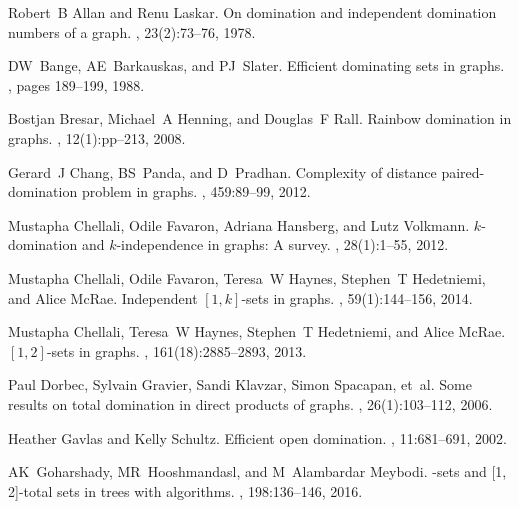\documentclass[A4,12pt]{article}
\theoremstyle{definition}
\theoremstyle{remark}
\begin{document}
\begin{thebibliography}{10}
	
	Robert~B Allan and Renu Laskar.
	\newblock On domination and independent domination numbers of a graph.
	, 23(2):73--76, 1978.
	
	DW~Bange, AE~Barkauskas, and PJ~Slater.
	\newblock Efficient dominating sets in graphs.
	, pages 189--199, 1988.
	
	Bostjan Bresar, Michael~A Henning, and Douglas~F Rall.
	\newblock Rainbow domination in graphs.
	, 12(1):pp--213, 2008.
	
	Gerard~J Chang, BS~Panda, and D~Pradhan.
	\newblock Complexity of distance paired-domination problem in graphs.
	, 459:89--99, 2012.
	
	Mustapha Chellali, Odile Favaron, Adriana Hansberg, and Lutz Volkmann.
	\newblock $k$-domination and $k$-independence in graphs: A survey.
	, 28(1):1--55, 2012.
	
	Mustapha Chellali, Odile Favaron, Teresa~W Haynes, Stephen~T Hedetniemi, and
	Alice McRae.
	\newblock Independent $[1, k]$-sets in graphs.
	, 59(1):144--156, 2014.
	
	Mustapha Chellali, Teresa~W Haynes, Stephen~T Hedetniemi, and Alice McRae.
	\newblock $[1, 2]$-sets in graphs.
	, 161(18):2885--2893, 2013.
	
	Paul Dorbec, Sylvain Gravier, Sandi Klavzar, Simon Spacapan, et~al.
	\newblock Some results on total domination in direct products of graphs.
	, 26(1):103--112, 2006.
	
	Heather Gavlas and Kelly Schultz.
	\newblock Efficient open domination.
	, 11:681--691, 2002.
	
	AK~Goharshady, MR~Hooshmandasl, and M~Alambardar Meybodi.
	\newblock [1, 2]-sets and [1, 2]-total sets in trees with algorithms.
	, 198:136--146, 2016.
	

\end{thebibliography}
\end{document}
